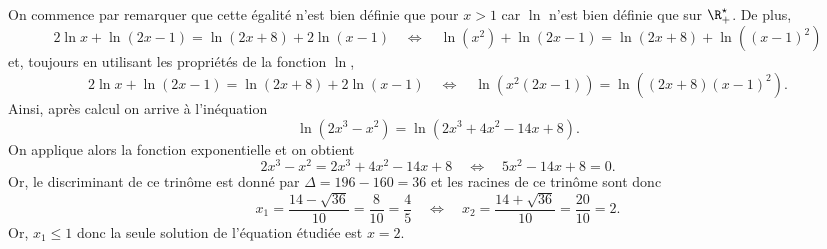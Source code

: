 On commence par remarquer que cette égalité n'est bien définie que pour $x > 1$ car $\ln$ n'est bien définie que sur $\R_+^{\star}$. De plus,
	\[		2 \ln x +\ln(2x-1) = \ln(2x+8) + 2\ln(x-1) \quad \Leftrightarrow  \quad \ln(x^2) +\ln(2x-1) = \ln(2x+8) + \ln((x-1)^2)\]
	et, toujours en utilisant les propriétés de la fonction $\ln$,
	\[ 2 \ln x +\ln(2x-1) = \ln(2x+8) + 2\ln(x-1)  \quad \Leftrightarrow  \quad \ln(x^2(2x-1)) = \ln((2x+8)(x-1)^2).\]
	Ainsi, après calcul on arrive à l'inéquation
	\[ \ln(2x^3-x^2) = \ln(2x^3 + 4x^2  - 14x + 8).\]
	On applique alors la fonction exponentielle et on obtient
		\[ 2x^3-x^2 = 2x^3 + 4x^2  - 14x + 8 \quad \Leftrightarrow  \quad 5x^2 - 14x + 8 = 0.\]
Or, le discriminant de ce trinôme est donné par $\Delta = 196 - 160 = 36$ et les racines de ce trinôme sont donc
\[ x_1 = \frac{14 - \sqrt{36}}{10} = \frac{8}{10} = \frac{4}{5} \quad \Leftrightarrow \quad 
x_2 = \frac{14 + \sqrt{36}}{10} = \frac{20}{10} = 2.\]
Or, $x_1 \leqslant 1$ donc la seule solution de l'équation étudiée est $x = 2$.